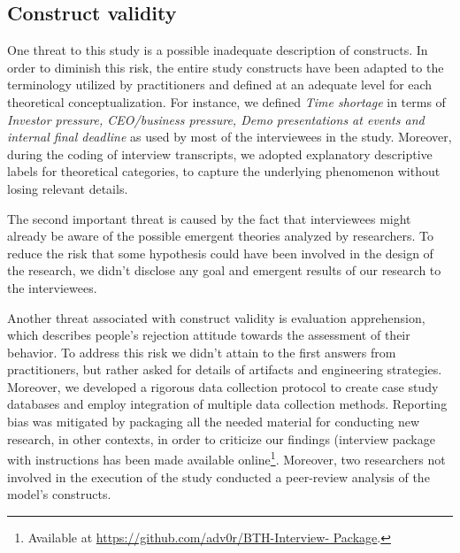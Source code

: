 \documentclass[10pt,journal,letterpaper,compsoc]{IEEEtran}
\begin{document}
\subsection{Construct validity} %
One threat to this study is a possible inadequate description of constructs. In 
order to diminish this risk, the entire study constructs have been adapted to 
the terminology utilized by practitioners and defined at an adequate level for 
each theoretical conceptualization. For instance, we defined \textit{Time 
shortage} in terms of \textit{Investor pressure, CEO/business pressure, Demo 
presentations at events and internal final deadline} as used by most of the 
interviewees in the study.
Moreover, during the coding of interview transcripts, we adopted explanatory
descriptive labels for theoretical categories, to capture the underlying
phenomenon without losing relevant details.

The second important threat is caused by the fact that interviewees might 
already be aware of the possible emergent theories analyzed by researchers. To 
reduce the risk that some hypothesis could have been involved in the design of 
the research, we didn't disclose any goal and emergent results of our research 
to the interviewees.

Another threat associated with construct validity is evaluation apprehension,
which describes people's rejection attitude towards the assessment of their
behavior. To address this risk we didn't attain to the first answers from
practitioners, but rather asked for details of artifacts and engineering
strategies. %
Moreover, we developed a rigorous data collection protocol to create case study 
databases and employ integration of multiple data collection methods. 
Reporting bias was mitigated by packaging all the needed material for
conducting new research, in other contexts, in order to criticize our findings
(interview package with instructions has been made available
online\footnote{Available at \url{https://github.com/adv0r/BTH-Interview-
Package}.}. %
Moreover, two researchers not involved in the execution of the study
conducted a peer-review analysis of the model's constructs.
\end{document}
